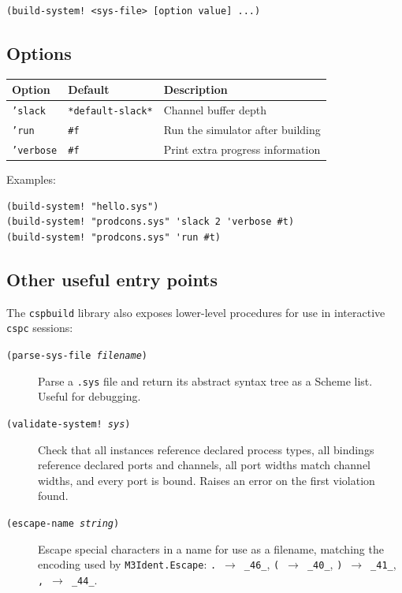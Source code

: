 \documentclass[11pt]{article}
\newcommand{\nonterminal}[1]{\textit{#1}}
\begin{document}
\begin{Verbatim}[samepage=true]
(build-system! <sys-file> [option value] ...)
\end{Verbatim}

\subsection{Options}

\begin{tabular}{lll}
\toprule
Option & Default & Description \\
\midrule
\texttt{'slack} & \texttt{*default-slack*} & Channel buffer depth \\
\texttt{'run} & \texttt{\#f} & Run the simulator after building \\
\texttt{'verbose} & \texttt{\#f} & Print extra progress information \\
\bottomrule
\end{tabular}

\bigskip

Examples:
\begin{Verbatim}[samepage=true]
(build-system! "hello.sys")
(build-system! "prodcons.sys" 'slack 2 'verbose #t)
(build-system! "prodcons.sys" 'run #t)
\end{Verbatim}

\subsection{Other useful entry points}

The \texttt{cspbuild} library also exposes lower-level procedures for
use in interactive \texttt{cspc} sessions:

\begin{description}
\item[\texttt{(parse-sys-file \nonterminal{filename})}]
  Parse a \texttt{.sys} file and return its abstract syntax tree
  as a Scheme list.  Useful for debugging.

\item[\texttt{(validate-system! \nonterminal{sys})}]
  Check that all instances reference declared process types,
  all bindings reference declared ports and channels, all port
  widths match channel widths, and every port is bound.
  Raises an error on the first violation found.

\item[\texttt{(escape-name \nonterminal{string})}]
  Escape special characters in a name for use as a filename,
  matching the encoding used by \texttt{M3Ident.Escape}:
  \texttt{.}~$\to$~\texttt{\_46\_},
  \texttt{(}~$\to$~\texttt{\_40\_},
  \texttt{)}~$\to$~\texttt{\_41\_},
  \texttt{,}~$\to$~\texttt{\_44\_}.
\end{description}
\end{document}
